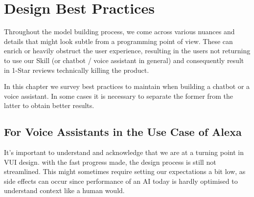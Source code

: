 \chapter{Design Best Practices}
\label{designbestprac}


Throughout the model building process, we come across various nuances and details that might look subtle from a programming point of view. %
These can enrich or %
heavily obstruct the user experience, resulting in the users not returning to use our Skill (or chatbot / voice assistant in general) %
and consequently result in 1-Star reviews technically killing the product.

In this chapter we survey best practices to maintain when building a chatbot or a voice assistant. In some cases it is necessary to separate the former from the latter to obtain better results.


\section{For Voice Assistants in the Use Case of Alexa}
\label{designalexa:bestprac}





It's important to understand and acknowledge that we are at a turning point %
in VUI design.%
with the fast progress made, the design process is still %
not streamlined. %
This might sometimes require setting our expectations a bit low, as side effects can occur since%
performance of an AI today is hardly optimised to understand context like a human would. %
  
